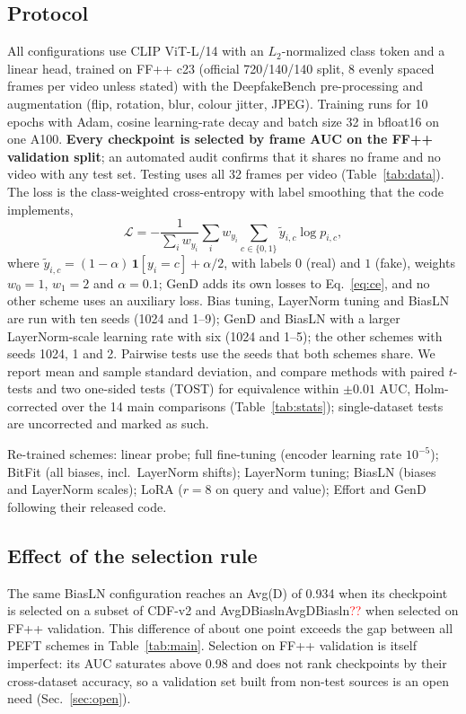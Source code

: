 \documentclass[fonts]{icst}
\newcommand{\num}[1]{\ifcsname #1\endcsname\csname #1\endcsname\else\textcolor{red}{??}\fi}
\begin{document}
\subsection{Protocol}
\label{sec:protocol}
All configurations use CLIP ViT-L/14 with an $L_2$-normalized class token and a linear head, trained on FF++ c23 (official 720/140/140 split, 8 evenly spaced frames per video unless stated) with the DeepfakeBench pre-processing and augmentation (flip, rotation, blur, colour jitter, JPEG). Training runs for 10 epochs with Adam, cosine learning-rate decay and batch size 32 in bfloat16 on one A100. \textbf{Every checkpoint is selected by frame AUC on the FF++ validation split}; an automated audit confirms that it shares no frame and no video with any test set. Testing uses all 32 frames per video (Table~\ref{tab:data}). The loss is the class-weighted cross-entropy with label smoothing that the code implements,
\begin{equation}
\mathcal{L}=-\frac{1}{\sum_i w_{y_i}}\sum_{i} w_{y_i}\sum_{c\in\{0,1\}}\tilde{y}_{i,c}\log p_{i,c},
\label{eq:ce}
\end{equation}
where $\tilde{y}_{i,c}=(1-\alpha)\,\mathbf{1}[y_i=c]+\alpha/2$, with labels $0$ (real) and $1$ (fake), weights $w_0=1$, $w_1=2$ and $\alpha=0.1$; GenD adds its own losses to Eq.~\eqref{eq:ce}, and no other scheme uses an auxiliary loss. Bias tuning, LayerNorm tuning and BiasLN are run with ten seeds (1024 and 1--9); GenD and BiasLN with a larger LayerNorm-scale learning rate with six (1024 and 1--5); the other schemes with seeds 1024, 1 and 2. Pairwise tests use the seeds that both schemes share. We report mean and sample standard deviation, and compare methods with paired $t$-tests and two one-sided tests (TOST) for equivalence within $\pm0.01$ AUC, Holm-corrected over the 14 main comparisons (Table~\ref{tab:stats}); single-dataset tests are uncorrected and marked as such.

Re-trained schemes: linear probe; full fine-tuning (encoder learning rate $10^{-5}$); BitFit (all biases, incl.\ LayerNorm shifts); LayerNorm tuning; BiasLN (biases and LayerNorm scales); LoRA ($r{=}8$ on query and value); Effort and GenD following their released code.

\subsection{Effect of the selection rule}
\label{sec:selection}
The same BiasLN configuration reaches an Avg(D) of 0.934 when its checkpoint is selected on a subset of CDF-v2 and \num{AvgDBiasln} when selected on FF++ validation. This difference of about one point exceeds the gap between all PEFT schemes in Table~\ref{tab:main}. Selection on FF++ validation is itself imperfect: its AUC saturates above 0.98 and does not rank checkpoints by their cross-dataset accuracy, so a validation set built from non-test sources is an open need (Sec.~\ref{sec:open}).
\end{document}
